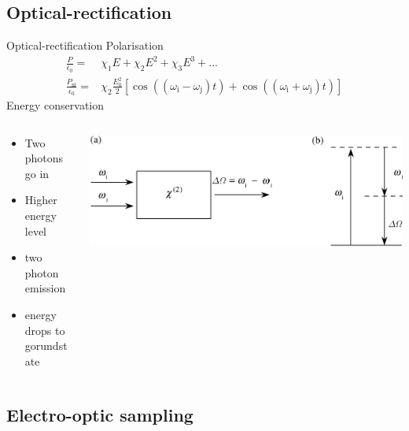 \documentclass[aspectratio=1610, 9pt]{beamer}
\begin{document}
\subsection{Optical-rectification}
\begin{frame}{Optical-rectification}
 Polarisation \nocite{wiki_book}
  \begin{align}
    \frac{P}{\epsilon_0} =& \chi_1E + \chi_2 E^2 + \chi_3 E^3 + ... \\
    \frac{P_\text{nl}}{\epsilon_0} =& \chi_2 \frac{E_0^2}{2} \left[ \cos((\omega_\text{i} - \omega_\text{j})t) + \cos((\omega_\text{i} + \omega_\text{j})t) \right ]
  \end{align}
  Energy conservation \nocite{boyd2020nonlinear}
  \begin{columns}
    \begin{column}{.4\textwidth}
      \begin{itemize}
        \item Two photons go in
        \item Higher energy level
        \item two photon emission 
        \item energy drops to gorundstate
      \end{itemize}
    \end{column}
    \begin{column}{.5\textwidth}
      \includegraphics[width=\textwidth]{images/diffrence_frequency_mixing.PNG}
    \end{column}
  \end{columns}
\end{frame}

\subsection{Electro-optic sampling}
\end{document}
